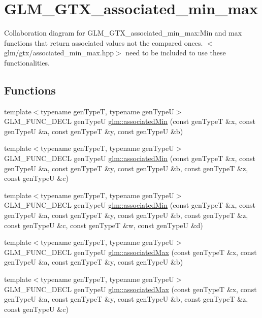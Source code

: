 \hypertarget{group__gtx__associated__min__max}{
\section{GLM\_\-GTX\_\-associated\_\-min\_\-max}
\label{group__gtx__associated__min__max}
}


Collaboration diagram for GLM\_\-GTX\_\-associated\_\-min\_\-max:Min and max functions that return associated values not the compared onces. $<$glm/gtx/associated\_\-min\_\-max.hpp$>$ need to be included to use these functionalities.  
\subsection*{Functions}
\begin{CompactItemize}
\item 
{\footnotesize template$<$typename genTypeT, typename genTypeU$>$ }\\GLM\_\-FUNC\_\-DECL genTypeU \hyperlink{group__gtx__associated__min__max_ge85252492710f54ac1ba963a3468a6d6}{glm::associatedMin} (const genTypeT \&x, const genTypeU \&a, const genTypeT \&y, const genTypeU \&b)
\item 
{\footnotesize template$<$typename genTypeT, typename genTypeU$>$ }\\GLM\_\-FUNC\_\-DECL genTypeU \hyperlink{group__gtx__associated__min__max_g2d68336e5522b3f78f824ae2f0aea8db}{glm::associatedMin} (const genTypeT \&x, const genTypeU \&a, const genTypeT \&y, const genTypeU \&b, const genTypeT \&z, const genTypeU \&c)
\item 
{\footnotesize template$<$typename genTypeT, typename genTypeU$>$ }\\GLM\_\-FUNC\_\-DECL genTypeU \hyperlink{group__gtx__associated__min__max_g4475cafc0a4696724beef1a584f1678b}{glm::associatedMin} (const genTypeT \&x, const genTypeU \&a, const genTypeT \&y, const genTypeU \&b, const genTypeT \&z, const genTypeU \&c, const genTypeT \&w, const genTypeU \&d)
\item 
{\footnotesize template$<$typename genTypeT, typename genTypeU$>$ }\\GLM\_\-FUNC\_\-DECL genTypeU \hyperlink{group__gtx__associated__min__max_g615648ddc725239945caf272498ae4ad}{glm::associatedMax} (const genTypeT \&x, const genTypeU \&a, const genTypeT \&y, const genTypeU \&b)
\item 
{\footnotesize template$<$typename genTypeT, typename genTypeU$>$ }\\GLM\_\-FUNC\_\-DECL genTypeU \hyperlink{group__gtx__associated__min__max_g120284c5b592366690f3dd6a110f3605}{glm::associatedMax} (const genTypeT \&x, const genTypeU \&a, const genTypeT \&y, const genTypeU \&b, const genTypeT \&z, const genTypeU \&c)

\end{CompactItemize}
